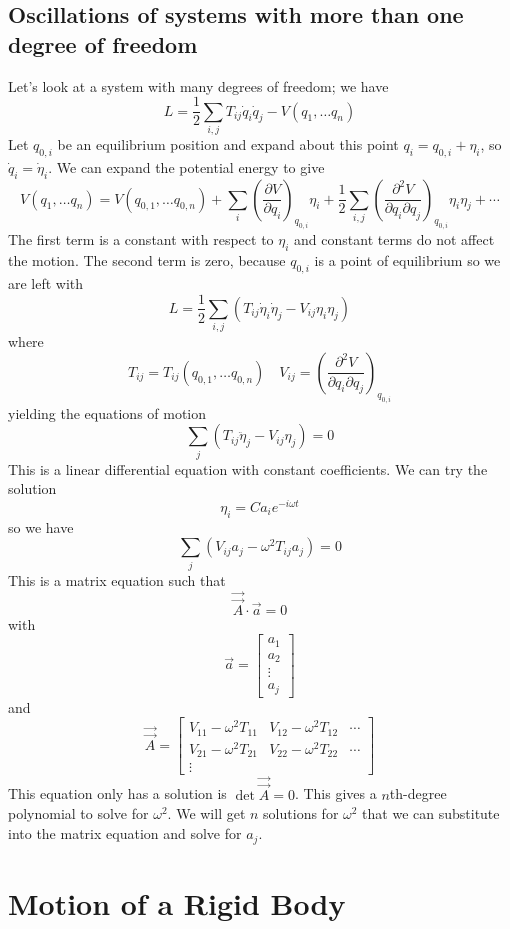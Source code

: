 \section{Oscillations of systems with more than one degree of freedom}
Let's look at a system with many degrees of freedom; we have
\[L={\frac {1}{2}}\sum _{i,j}T_{ij}{\dot {q}}_{i}{\dot {q}}_{j}-V\left(q_{1},\ldots q_{n}\right)\]
Let $q_{0,i}$ be an equilibrium position and expand about this point $q_{i}=q_{0,i}+\eta _{i}$, so $\dot{q}_{i}=\dot {\eta }_{i}$.
We can expand the potential energy to give
\[V\left(q_{1},\ldots q_{n}\right)=V\left(q_{0,1},\ldots q_{0,n}\right)+\sum _{i}\left({\frac {\partial V}{\partial q_{i}}}\right)_{q_{0,i}}\eta _{i}+{\frac {1}{2}}\sum _{i,j}\left({\frac {\partial ^{2}V}{\partial q_{i}\partial q_{j}}}\right)_{q_{0,i}}\eta _{i}\eta _{j}+\cdots\]
The first term is a constant with respect to $\eta_i$ and constant terms do not affect the motion. The second term is zero, because $q_{0,i}$ is a point of equilibrium so we are left with
\[L={\frac {1}{2}}\sum _{i,j}\left(T_{ij}{\dot {\eta }}_{i}{\dot {\eta }}_{j}-V_{ij}\eta _{i}\eta _{j}\right)\]
where
\[T_{ij}=T_{ij}\left(q_{0,1},\ldots q_{0,n}\right) \quad V_{ij}=\left({\frac {\partial ^{2}V}{\partial q_{i}\partial q_{j}}}\right)_{q_{0,i}}\]
yielding the equations of motion
\[\sum _{j}\left(T_{ij}{\ddot {\eta }}_{j}-V_{ij}\eta _{j}\right)=0\]
This is a linear differential equation with constant coefficients. We can try the solution
\[\eta _{i}=Ca_{i}e^{-i\omega t}\]
so we have
\[\sum _{j}\left(V_{ij}a_{j}-\omega ^{2}T_{ij}a_{j}\right)=0\]
This is a matrix equation such that
\[{\vec {\vec {A}}}\cdot {\vec {a}}=0\]
with
\[{\vec {a}}=\left[{\begin{matrix}a_{1}\\a_{2}\\\vdots \\a_{j}\end{matrix}}\right]\]
and
\[{\vec {\vec {A}}}=\left[{\begin{matrix}V_{11}-\omega ^{2}T_{11}&V_{12}-\omega ^{2}T_{12}&\cdots \\V_{21}-\omega ^{2}T_{21}&V_{22}-\omega ^{2}T_{22}&\cdots \\\vdots &&\end{matrix}}\right]\]
This equation only has a solution is $\det {\vec {\vec {A}}}=0$. This gives a $n$th-degree polynomial to solve for $\omega^2$. We will get $n$ solutions for $\omega^2$ that we can substitute into the matrix equation and solve for $a_j$.

\chapter{Motion of a Rigid Body}
